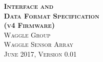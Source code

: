 \documentclass{article}
\begin{document}
\begin{titlepage}
   \begin{center}
        \Huge\textbf{\textsc{Interface and \\ Data Format Specification \\
        \Large\textsc(v4 Firmware)}}\\[0.5cm]
        \Large\textsc{Waggle Group \\ Waggle Sensor Array}\\[1cm]
        \large\textsc{June 2017, }
        \large\textsc{Version 0.01}\\
   \end{center}
\end{titlepage}

\tableofcontents
\newpage



% 
% 
% 
% 
% 
% 
% 
% 

\appendix
% 
\end{document}

